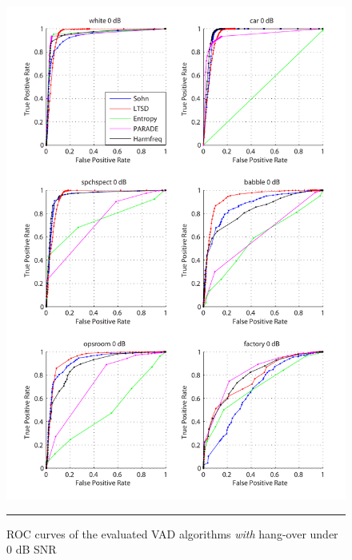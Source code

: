 \begin{figure}[htbp]
	\centering
		\includegraphics[width=1.0\columnwidth]{Figures/Chapter4/0dBh.pdf}
		\rule{37em}{0.5pt}
	\caption[ROC curves of the evaluated algorithms \emph{with} hang-over under 0 dB SNR]{ROC curves of the evaluated VAD algorithms \emph{with} hang-over under 0 dB SNR}
	\label{fig:0dBh}
\end{figure}

